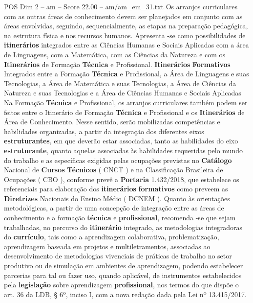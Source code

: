 \begin{textsample}{POS Dim 2 – am – Score 22.00 – am/am\_em\_31.txt}
Os arranjos curriculares com as outras áreas de conhecimento devem ser planejados em conjunto com as áreas envolvidas, seguindo, sequencialmente, as etapas na preparação pedagógica, na estrutura física e nos recursos humanos.
Apresenta -se como possibilidades de \textbf{itinerários} integrados entre as Ciências Humanas e Sociais Aplicadas com a área de Linguagens, com a Matemática, com as Ciências da Natureza e com os \textbf{Itinerários} de Formação \textbf{Técnica} e Profissional. \textbf{Itinerários} \textbf{Formativos} Integrados entre a Formação \textbf{Técnica} e Profissional, a Área de Linguagens e suas Tecnologias, a Área de Matemática e suas Tecnologias, a Área de Ciências da Natureza e suas Tecnologias e a Área de Ciências Humanas e Sociais Aplicadas Na Formação \textbf{Técnica} e Profissional, os arranjos curriculares também podem ser feitos entre o Itinerário de Formação \textbf{Técnica} e Profissional e os \textbf{Itinerários} de Área de Conhecimento.
Nesse sentido, serão mobilizadas competências e habilidades organizadas, a partir da integração dos diferentes eixos \textbf{estruturantes}, em que deverão estar associadas, tanto as habilidades do eixo \textbf{estruturante}, quanto aquelas associadas às habilidades requeridas pelo mundo do trabalho e as específicas exigidas pelas ocupações previstas no \textbf{Catálogo} Nacional de \textbf{Cursos} \textbf{Técnicos} ( CNCT ) e na Classificação Brasileira de Ocupações ( CBO ), conforme prevê a \textbf{Portaria} 1.432/2018, que estabelece os referenciais para elaboração dos \textbf{itinerários} \textbf{formativos} como preveem as \textbf{Diretrizes} Nacionais do Ensino Médio ( DCNEM ).
Quanto às orientações metodológicas, a partir de uma concepção de integração entre as áreas de conhecimento e a formação \textbf{técnica} e \textbf{profissional}, recomenda -se que sejam trabalhadas, no percurso do \textbf{itinerário} integrado, as metodologias integradoras do \textbf{currículo}, tais como a aprendizagem colaborativa, problematização, aprendizagem baseada em projetos e multiletramentos, associadas ao desenvolvimento de metodologias vivenciais de práticas de trabalho no setor produtivo ou de simulação em ambientes de aprendizagem, podendo estabelecer parcerias para tal ou fazer uso, quando aplicável, de instrumentos estabelecidos pela \textbf{legislação} sobre aprendizagem \textbf{profissional}, nos termos do que dispõe o art. 36 da LDB, § 6º, inciso I, com a nova redação dada pela Lei nº 13.415/2017.

\end{textsample}
